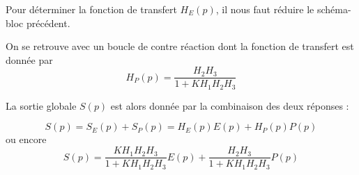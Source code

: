 Pour déterminer la fonction de transfert $H_E(p)$, il nous faut réduire le
schéma-bloc précédent.
\begin{center}
    
\end{center}
On se retrouve avec un boucle de contre réaction dont la fonction
de transfert est donnée par 
\[
    H_P(p)=\dfrac{H_2H_3}{1+KH_1H_2H_3}
\]

La sortie globale $S(p)$ est alors donnée par la combinaison des deux réponses :

\[
    S(p)=S_E(p)+S_P(p)=H_E(p)E(p) + H_P(p)P(p)
\]
ou encore
\[
    S(p)=\dfrac{KH_1H_2H_3}{1+KH_1H_2H_3}E(p)+\dfrac{H_2H_3}{1+KH_1H_2H_3} P(p)
\]



